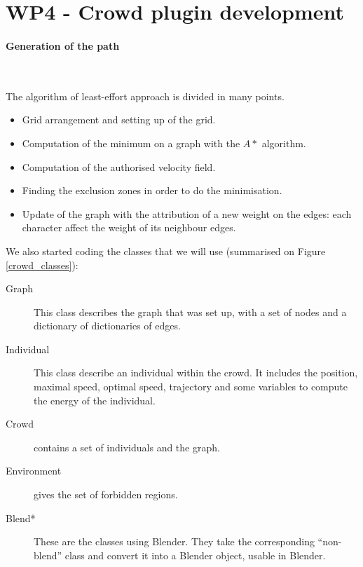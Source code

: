 \section{WP4 - Crowd plugin development}

\paragraph{Generation of the path}~

\noindent The algorithm of least-effort approach is divided in many points.
\begin{itemize}
  \item Grid arrangement and setting up of the grid.
  \item Computation of the minimum on a graph with the $A*$ algorithm.
  \item Computation of the authorised velocity field.
  \item Finding the exclusion zones in order to do the minimisation.
  \item Update of the graph with the attribution of a new weight on the edges: each character affect the weight of its neighbour edges.
\end{itemize}



\noindent We also started coding the classes that we will use (summarised on Figure \ref{crowd_classes}):
\begin{description}
  \item[Graph] This class describes the graph that was set up, with a set of nodes and a dictionary of dictionaries of edges.
  \item[Individual] This class describe an individual within the crowd. It includes the position, maximal speed, optimal speed, trajectory and some variables to compute the energy of the individual.
  \item[Crowd] contains a set of individuals and the graph.
  \item[Environment] gives the set of forbidden regions.
  \item[Blend*] These are the classes using Blender. They take the corresponding ``non-blend'' class and convert it into a Blender object, usable in Blender. 
\end{description}

